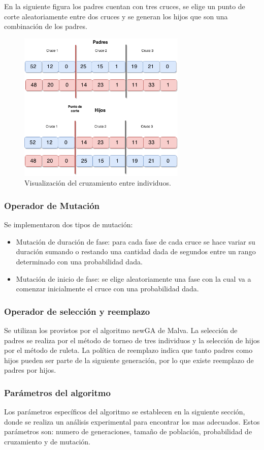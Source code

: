 En la siguiente figura los padres cuentan con tres cruces, se elige un punto de corte aleatoriamente entre dos cruces y se generan los hijos que son una combinación de los padres.

\begin{figure}[H]
	\centering
	\includegraphics[width=8cm]{Figures/alg_cruzamiento}
	\caption{Visualización del cruzamiento entre individuos.}
	\label{fig:op_cruzamiento}
\end{figure}



\subsubsection{Operador de Mutación}
Se implementaron dos tipos de mutación:
\begin{itemize}

\item Mutación de duración de fase: para cada fase de cada cruce se
hace variar su duración sumando o restando una cantidad dada
de segundos entre un rango determinado con una probabilidad
dada.
\item Mutación de inicio de fase: se elige aleatoriamente una fase
con la cual va a comenzar inicialmente el cruce con una probabilidad dada.

\end{itemize}

\subsubsection{Operador de selección y reemplazo}
Se  utilizan los provistos por el algoritmo newGA de Malva. La selección de padres se realiza por el método de torneo de tres individuos y la selección de hijos por el método de ruleta. La política de reemplazo indica que tanto padres como hijos pueden ser parte de la siguiente generación, por lo que existe reemplazo de padres por hijos.

\subsubsection{Parámetros del algoritmo}
Los parámetros específicos del algoritmo se establecen en la siguiente sección, donde se realiza un análisis experimental para encontrar los mas adecuados. Estos parámetros son: numero de generaciones, tamaño de población, probabilidad de cruzamiento y de mutación.